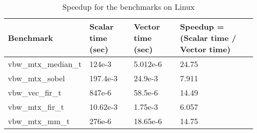 \begin{table}[htbp]
	\centering
	\begin{adjustbox}{width=1\textwidth}
		\small		
	
	\begin{tabular}{llll}
		\toprule
		\textbf{Benchmark} & \textbf{Scalar time (sec)} & \textbf{Vector time (sec)} & \textbf{Speedup = (Scalar time / Vector time)} \\
		\midrule
			vbw\_mtx\_median\_t & 124e-3 & 5.012e-6 & 24.75 \\
			vbw\_mtx\_sobel & 197.4e-3 & 24.9e-3 & 7.911 \\
			vbw\_vec\_fir\_t & 847e-6 & 58.5e-6 & 14.49 \\
			vbw\_mtx\_fir\_t & 10.62e-3 & 1.75e-3 & 6.057 \\
			vbw\_mtx\_mm\_t & 276e-6 & 18.65e-6 & 14.75 \\
		\bottomrule
	\end{tabular}%
\end{adjustbox}%
\caption{Speedup for the benchmarks on Linux}
\label{t11:tab}%
\end{table}%